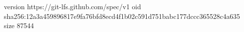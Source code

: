 version https://git-lfs.github.com/spec/v1
oid sha256:12a3a459896817e9fa76bfd8ecd4f1b02c591d751babc177dccc365528c4a635
size 87544
